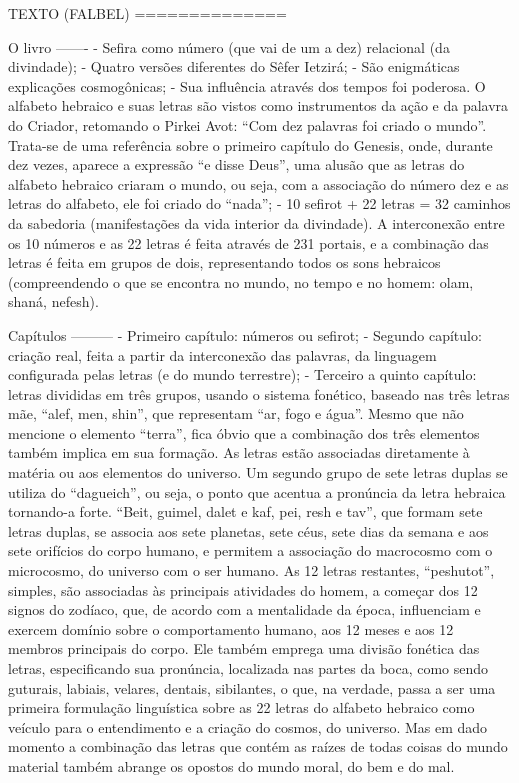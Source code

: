 TEXTO (FALBEL)
==============

O livro
-------
- Sefira como número (que vai de um a dez) relacional (da divindade);
- Quatro versões diferentes do Sêfer Ietzirá;
- São enigmáticas explicações cosmogônicas;
- Sua influência através dos tempos foi poderosa. O alfabeto hebraico e suas letras são vistos como instrumentos da ação e da palavra do Criador, retomando o Pirkei Avot: “Com dez palavras foi criado o mundo”. Trata-se de uma referência sobre o primeiro capítulo do Genesis, onde, durante dez vezes, aparece a expressão “e disse Deus”, uma alusão que as letras do alfabeto hebraico criaram o mundo, ou seja, com a associação do número dez e as letras do alfabeto, ele foi criado do “nada”;
- 10 sefirot + 22 letras = 32 caminhos da sabedoria (manifestações da vida interior da divindade). A interconexão entre os 10 números e as 22 letras é feita através de 231 portais, e a combinação das letras é feita em grupos de dois, representando todos os sons hebraicos (compreendendo o que se encontra no mundo, no tempo e no homem: olam, shaná, nefesh).

Capítulos
---------
- Primeiro capítulo: números ou sefirot;
- Segundo capítulo: criação real, feita a partir da interconexão das palavras, da linguagem configurada pelas letras (e do mundo terrestre);
- Terceiro a quinto capítulo: letras divididas em três grupos, usando o sistema fonético, baseado nas três letras mãe, “alef, men, shin”, que representam “ar, fogo e água”. Mesmo que não mencione o elemento “terra”, fica óbvio que a combinação dos três elementos também implica em sua formação. As letras estão associadas diretamente à matéria ou aos elementos do universo. Um segundo grupo de sete letras duplas se utiliza do “dagueich”, ou seja, o ponto que acentua a pronúncia da letra hebraica tornando-a forte. “Beit, guimel, dalet e kaf, pei, resh e tav”, que formam sete letras duplas, se associa aos sete planetas, sete céus, sete dias da semana e aos sete orifícios do corpo humano, e permitem a associação do macrocosmo com o microcosmo, do universo com o ser humano. As 12 letras restantes, “peshutot”, simples, são associadas às principais atividades do homem, a começar dos 12 signos do zodíaco, que, de acordo com a mentalidade da época, influenciam e exercem domínio sobre o comportamento humano, aos 12 meses e aos 12 membros principais do corpo. Ele também emprega uma divisão fonética das letras, especificando sua pronúncia, localizada nas partes da boca, como sendo guturais, labiais, velares, dentais, sibilantes, o que, na verdade, passa a ser uma primeira formulação linguística sobre as 22 letras do alfabeto hebraico como veículo para o entendimento e a criação do cosmos, do universo. Mas em dado momento a combinação das letras que contém as raízes de todas coisas do mundo material também abrange os opostos do mundo moral, do bem e do mal.

